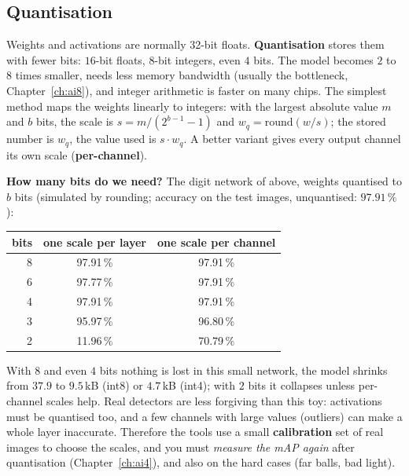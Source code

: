 \subsection*{Quantisation}
Weights and activations are normally 32-bit floats. \textbf{Quantisation} stores them with fewer bits: $16$-bit floats, $8$-bit integers, even $4$ bits. The model becomes $2$ to $8$ times smaller, needs less memory bandwidth (usually the bottleneck, Chapter~\ref{ch:ai8}), and integer arithmetic is faster on many chips. The simplest method maps the weights linearly to integers: with the largest absolute value $m$ and $b$ bits, the scale is $s=m/(2^{b-1}-1)$ and $w_q=\mathrm{round}(w/s)$; the stored number is $w_q$, the value used is $s\cdot w_q$. A better variant gives every output channel its own scale (\textbf{per-channel}).
\begin{example}
\textbf{How many bits do we need?} The digit network of above, weights quantised to $b$ bits (simulated by rounding; accuracy on the test images, unquantised: $97.91\,\%$):
\begin{center}
\renewcommand{\arraystretch}{1.2}
\begin{tabular}{rcc}
\textbf{bits} & \textbf{one scale per layer} & \textbf{one scale per channel}\\ \hline
8 & 97.91\,\% & 97.91\,\%\\
6 & 97.77\,\% & 97.91\,\%\\
4 & 97.91\,\% & 97.91\,\%\\
3 & 95.97\,\% & 96.80\,\%\\
2 & 11.96\,\% & 70.79\,\%\\
\end{tabular}
\end{center}
With $8$ and even $4$ bits nothing is lost in this small network, the model shrinks from $37.9$ to $9.5$\,kB (int8) or $4.7$\,kB (int4); with $2$ bits it collapses unless per-channel scales help. Real detectors are less forgiving than this toy: activations must be quantised too, and a few channels with large values (outliers) can make a whole layer inaccurate. Therefore the tools use a small \textbf{calibration} set of real images to choose the scales, and you must \emph{measure the mAP again} after quantisation (Chapter~\ref{ch:ai4}), and also on the hard cases (far balls, bad light).
\end{example}
